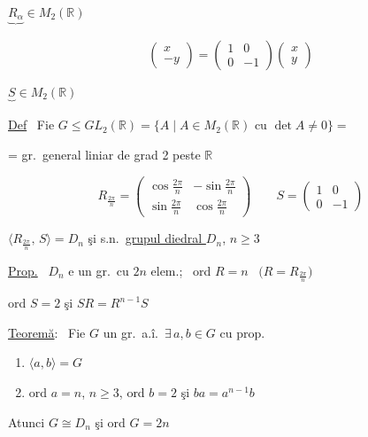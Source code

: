 \documentclass[12pt]{article}
\begin{document}
\noindent $\underbrace{R_\alpha}_{} \in M_2(\mathbb{R})$

\bigskip
\noindent
\[
\begin{pmatrix}x\\-y\end{pmatrix} = \begin{pmatrix}1&0\\0&-1\end{pmatrix}\begin{pmatrix}x\\y\end{pmatrix}
\]

\noindent $\underbrace{S}_{}\in M_2(\mathbb{R})$

\bigskip
\noindent\underline{Def} \ Fie $G\leq GL_2(\mathbb{R}) = \{A \mid A\in M_2(\mathbb{R}) \text{ cu } \det A\neq 0\} =$

\noindent = gr.\ general liniar de grad 2 peste $\mathbb{R}$

\bigskip
\noindent
\[
R_{\frac{2\pi}{n}} = \begin{pmatrix}\cos\frac{2\pi}{n} & -\sin\frac{2\pi}{n}\\[4pt] \sin\frac{2\pi}{n} & \cos\frac{2\pi}{n}\end{pmatrix}
\qquad
S=\begin{pmatrix}1&0\\0&-1\end{pmatrix}
\]

\bigskip
\noindent $\Big\langle R_{\frac{2\pi}{n}},\,S\Big\rangle = D_n$ şi s.n.\ \underline{grupul diedral $D_n$}, $n\geq 3$

\bigskip
\noindent\underline{Prop.} \ $D_n$ e un gr.\ cu $2n$ elem.; \ ord $R=n$ \ $\big(R=R_{\frac{2\pi}{n}}\big)$

\noindent ord $S=2$ şi $SR=R^{n-1}S$

\bigskip
\noindent\underline{Teoremă}: \ Fie $G$ un gr.\ a.î.\ $\exists\,a,b\in G$ cu prop.

\begin{enumerate}
\item[1)] $\langle a,b\rangle = G$
\item[2)] ord $a=n$, $n\geq 3$, ord $b=2$ şi $ba=a^{n-1}b$
\end{enumerate}

\noindent Atunci $G\cong D_n$ şi ord $G=2n$
\end{document}
